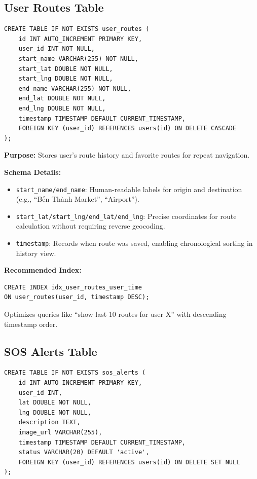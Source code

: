 \subsection{User Routes Table}

\begin{verbatim}
CREATE TABLE IF NOT EXISTS user_routes (
    id INT AUTO_INCREMENT PRIMARY KEY,
    user_id INT NOT NULL,
    start_name VARCHAR(255) NOT NULL,
    start_lat DOUBLE NOT NULL,
    start_lng DOUBLE NOT NULL,
    end_name VARCHAR(255) NOT NULL,
    end_lat DOUBLE NOT NULL,
    end_lng DOUBLE NOT NULL,
    timestamp TIMESTAMP DEFAULT CURRENT_TIMESTAMP,
    FOREIGN KEY (user_id) REFERENCES users(id) ON DELETE CASCADE
);
\end{verbatim}

\textbf{Purpose:} Stores user's route history and favorite routes for repeat navigation.

\textbf{Schema Details:}
\begin{itemize}
    \item \texttt{start\_name/end\_name}: Human-readable labels for origin and destination (e.g., ``Bến Thành Market'', ``Airport'').
    \item \texttt{start\_lat/start\_lng/end\_lat/end\_lng}: Precise coordinates for route calculation without requiring reverse geocoding.
    \item \texttt{timestamp}: Records when route was saved, enabling chronological sorting in history view.
\end{itemize}

\textbf{Recommended Index:}
\begin{verbatim}
CREATE INDEX idx_user_routes_user_time 
ON user_routes(user_id, timestamp DESC);
\end{verbatim}
Optimizes queries like ``show last 10 routes for user X'' with descending timestamp order.

\subsection{SOS Alerts Table}

\begin{verbatim}
CREATE TABLE IF NOT EXISTS sos_alerts (
    id INT AUTO_INCREMENT PRIMARY KEY,
    user_id INT,
    lat DOUBLE NOT NULL,
    lng DOUBLE NOT NULL,
    description TEXT,
    image_url VARCHAR(255),
    timestamp TIMESTAMP DEFAULT CURRENT_TIMESTAMP,
    status VARCHAR(20) DEFAULT 'active',
    FOREIGN KEY (user_id) REFERENCES users(id) ON DELETE SET NULL
);
\end{verbatim}

